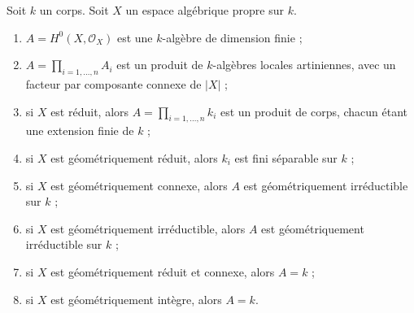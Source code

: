 \begin{lemma}
\label{lemma-proper-geometrically-reduced-global-sections}
Soit $k$ un corps. Soit $X$ un espace algébrique propre sur $k$.
\begin{enumerate}
\item $A = H^0(X, \mathcal{O}_X)$ est une $k$-algèbre de dimension finie ;
\item $A = \prod_{i = 1, \ldots, n} A_i$ est un produit de
$k$-algèbres locales artiniennes, avec un facteur par composante connexe de $|X|$ ;
\item si $X$ est réduit, alors $A = \prod_{i = 1, \ldots, n} k_i$
est un produit de corps, chacun étant une extension finie de $k$ ;
\item si $X$ est géométriquement réduit, alors $k_i$ est fini séparable
sur $k$ ;
\item si $X$ est géométriquement connexe, alors $A$ est géométriquement
irréductible sur $k$ ;
\item si $X$ est géométriquement irréductible, alors $A$ est géométriquement
irréductible sur $k$ ;
\item si $X$ est géométriquement réduit et connexe, alors $A = k$ ;
\item si $X$ est géométriquement intègre, alors $A = k$.
\end{enumerate}
\end{lemma}

